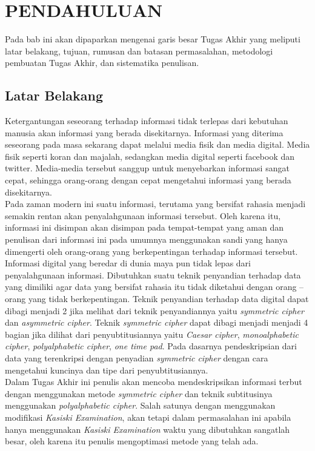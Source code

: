 \chapter{PENDAHULUAN}
  Pada bab ini akan dipaparkan mengenai garis besar Tugas Akhir yang meliputi latar belakang, tujuan, rumusan dan batasan permasalahan, metodologi pembuatan Tugas Akhir, dan sistematika penulisan.
  
  \section{Latar Belakang}	
	\indent Ketergantungan seseorang terhadap informasi tidak terlepas dari kebutuhan manusia akan informasi yang berada disekitarnya. Informasi yang diterima seseorang pada masa sekarang dapat melalui media fisik dan media digital. Media fisik seperti koran dan majalah, sedangkan media digital seperti facebook dan twitter. Media-media tersebut sanggup untuk menyebarkan informasi sangat cepat, sehingga orang-orang dengan cepat mengetahui informasi yang berada disekitarnya.
    \\
    \indent Pada zaman modern ini suatu informasi, terutama yang bersifat rahasia menjadi semakin rentan akan penyalahgunaan informasi tersebut. Oleh karena itu, informasi ini disimpan akan disimpan pada tempat-tempat yang aman dan penulisan dari informasi ini pada umumnya menggunakan sandi yang hanya dimengerti oleh orang-orang yang berkepentingan terhadap informasi tersebut.
    \\
	\indent Informasi digital yang beredar di dunia maya pun tidak lepas dari penyalahgunaan informasi. Dibutuhkan suatu teknik penyandian terhadap data yang dimiliki agar data yang bersifat rahasia itu tidak diketahui dengan orang – orang yang tidak berkepentingan. Teknik penyandian terhadap data digital dapat dibagi menjadi 2 jika melihat dari teknik penyandiannya yaitu \textit{symmetric cipher} dan \textit{asymmetric cipher}. Teknik \textit{symmetric cipher} dapat dibagi menjadi menjadi 4 bagian jika dilihat dari penyubtitusiannya yaitu \textit{Caesar cipher},\textit{ monoalphabetic cipher}, \textit{polyalphabetic cipher}, \textit{one time pad}. Pada dasarnya pendeskripsian dari data yang terenkripsi dengan penyadian \textit{symmetric cipher} dengan cara mengetahui kuncinya dan tipe dari penyubtitusiannya.
	\\
	\indent Dalam Tugas Akhir ini penulis akan mencoba mendeskripsikan informasi terbut dengan menggunakan metode \textit{symmetric cipher} dan teknik subtitusinya menggunakan \textit{polyalphabetic cipher}. Salah satunya dengan menggunakan modifikasi \textit{Kasiski Examination}, akan tetapi dalam permasalahan ini apabila hanya menggunakan \textit{Kasiski Examination} waktu yang dibutuhkan sangatlah besar, oleh karena itu penulis mengoptimasi metode yang telah ada.
    
